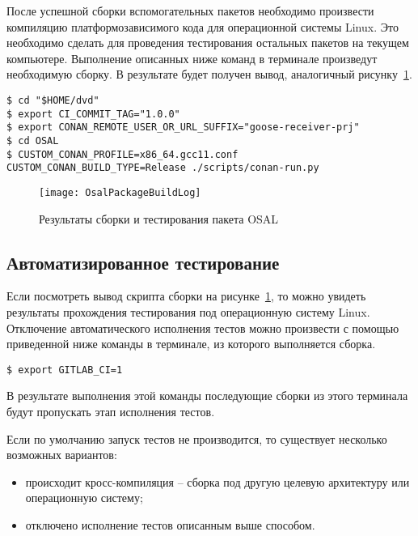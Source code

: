 После успешной сборки вспомогательных пакетов необходимо произвести компиляцию
платформозависимого кода для операционной системы Linux. Это необходимо
сделать для проведения тестирования остальных пакетов на текущем компьютере.
Выполнение описанных ниже команд в терминале произведут необходимую сборку.
В результате будет получен вывод, аналогичный
рисунку~\ref{pic::manual::osalPkgBuild}.

\begin{lstlisting}
$ cd "$HOME/dvd"
$ export CI_COMMIT_TAG="1.0.0"
$ export CONAN_REMOTE_USER_OR_URL_SUFFIX="goose-receiver-prj"
$ cd OSAL
$ CUSTOM_CONAN_PROFILE=x86_64.gcc11.conf CUSTOM_CONAN_BUILD_TYPE=Release ./scripts/conan-run.py
\end{lstlisting}

\fixTableSectionSpace

\begin{figure}[ht]
    \centering
    \texttt{[image: OsalPackageBuildLog]}
    \caption{Результаты сборки и тестирования пакета OSAL}
    \label{pic::manual::osalPkgBuild}
\end{figure}

\fixTableSectionSpace

\subsection{Автоматизированное тестирование}

Если посмотреть вывод скрипта сборки на рисунке~\ref{pic::manual::osalPkgBuild},
то можно увидеть результаты прохождения
тестирования под операционную систему Linux.
Отключение автоматического исполнения тестов можно произвести с помощью приведенной ниже
команды в терминале, из которого выполняется сборка.

\begin{lstlisting}
$ export GITLAB_CI=1
\end{lstlisting}

В результате выполнения этой команды последующие сборки из этого терминала
будут пропускать этап исполнения тестов.

Если по умолчанию запуск тестов не производится, то существует несколько
возможных вариантов:
\begin{itemize}
    \item происходит кросс-компиляция -- сборка под другую целевую архитектуру или операционную систему;
    \item отключено исполнение тестов описанным выше способом.
\end{itemize}

